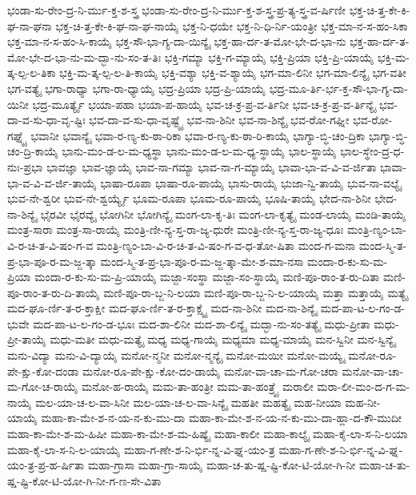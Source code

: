 {ಭಂಡಾ-ಸು-ರೇಂ-ದ್ರ-ನಿ-ರ್ಮು-ಕ್ತ-ಶ-ಸ್ತ್ರ
ಭಂಡಾ-ಸು-ರೇಂ-ದ್ರ-ನಿ-ರ್ಮು-ಕ್ತ-ಶ-ಸ್ತ್ರ-ಪ್ರ-ತ್ಯ-ಸ್ತ್ರ-ವ-ರ್ಷಿಣೀ
ಭಕ್ತ-ಚಿ-ತ್ತ-ಕೇ-ಕಿ-ಘ-ನಾ-ಘನಾ
ಭಕ್ತ-ಚಿ-ತ್ತ-ಕೇ-ಕಿ-ಘ-ನಾ-ಘ-ನಾಯೈ
ಭಕ್ತ-ನಿ-ಧಯೇ
ಭಕ್ತ-ನಿ-ಧಿ-ರ್ನಿ-ಯಂತ್ರೀ
ಭಕ್ತ-ಮಾ-ನ-ಸ-ಹಂ-ಸಿಕಾ
ಭಕ್ತ-ಮಾ-ನ-ಸ-ಹಂ-ಸಿ-ಕಾಯೈ
ಭಕ್ತ-ಸೌ-ಭಾ-ಗ್ಯ-ದಾ-ಯಿನ್ಯೈ
ಭಕ್ತ-ಹಾ-ರ್ದ-ತ-ಮೋ-ಭೇ-ದ-ಭಾ-ನು
ಭಕ್ತ-ಹಾ-ರ್ದ-ತ-ಮೋ-ಭೇ-ದ-ಭಾ-ನು-ಮ-ದ್ಭಾ-ನು-ಸಂ-ತ-ತಿಃ
ಭಕ್ತಿ-ಗಮ್ಯಾ
ಭಕ್ತಿ-ಗ-ಮ್ಯಾಯೈ
ಭಕ್ತಿ-ಪ್ರಿಯಾ
ಭಕ್ತಿ-ಪ್ರಿ-ಯಾಯೈ
ಭಕ್ತಿ-ಮ-ತ್ಕ-ಲ್ಪ-ಲ-ತಿಕಾ
ಭಕ್ತಿ-ಮ-ತ್ಕ-ಲ್ಪ-ಲ-ತಿ-ಕಾಯೈ
ಭಕ್ತಿ-ವಶ್ಯಾ
ಭಕ್ತಿ-ವ-ಶ್ಯಾಯೈ
ಭಗ-ಮಾ-ಲಿನೀ
ಭಗ-ಮಾ-ಲಿನ್ಯೈ
ಭಗ-ವತೀ
ಭಗ-ವತ್ಯೈ
ಭಗಾ-ರಾಧ್ಯಾ
ಭಗಾ-ರಾ-ಧ್ಯಾಯೈ
ಭದ್ರ-ಪ್ರಿಯಾ
ಭದ್ರ-ಪ್ರಿ-ಯಾಯೈ
ಭದ್ರ-ಮೂ-ರ್ತಿ-ರ್ಭ-ಕ್ತ-ಸೌ-ಭಾ-ಗ್ಯ-ದಾ-ಯಿನೀ
ಭದ್ರ-ಮೂರ್ತ್ಯೈ
ಭಯಾ-ಪಹಾ
ಭಯಾ-ಪ-ಹಾಯೈ
ಭವ-ಚ-ಕ್ರ-ಪ್ರ-ವ-ರ್ತಿನೀ
ಭವ-ಚ-ಕ್ರ-ಪ್ರ-ವ-ರ್ತಿನ್ಯೈ
ಭವ-ದಾ-ವ-ಸು-ಧಾ-ವೃ-ಷ್ಟಿಃ
ಭವ-ದಾ-ವ-ಸು-ಧಾ-ವೃಷ್ಟ್ಯೈ
ಭವ-ನಾ-ಶಿನೀ
ಭವ-ನಾ-ಶಿನ್ಯೈ
ಭವ-ರೋ-ಗಘ್ನೀ
ಭವ-ರೋ-ಗಘ್ನ್ಯೈ
ಭವಾನೀ
ಭವಾನ್ಯೈ
ಭವಾ-ರ-ಣ್ಯ-ಕು-ಠಾ-ರಿಕಾ
ಭವಾ-ರ-ಣ್ಯ-ಕು-ಠಾ-ರಿ-ಕಾಯೈ
ಭಾಗ್ಯಾ-ಬ್ಧಿ-ಚಂ-ದ್ರಿಕಾ
ಭಾಗ್ಯಾ-ಬ್ಧಿ-ಚಂ-ದ್ರಿ-ಕಾಯೈ
ಭಾನು-ಮಂ-ಡ-ಲ-ಮ-ಧ್ಯಸ್ಥಾ
ಭಾನು-ಮಂ-ಡ-ಲ-ಮ-ಧ್ಯ-ಸ್ಥಾಯೈ
ಭಾಲ-ಸ್ಥಾಯೈ
ಭಾಲ-ಸ್ಥೇಂ-ದ್ರ-ಧ-ನುಃ-ಪ್ರಭಾ
ಭಾವಜ್ಞಾ
ಭಾವ-ಜ್ಞಾಯೈ
ಭಾವ-ನಾ-ಗಮ್ಯಾ
ಭಾವ-ನಾ-ಗ-ಮ್ಯಾಯೈ
ಭಾವಾ-ಭಾ-ವ-ವಿ-ವ-ರ್ಜಿತಾ
ಭಾವಾ-ಭಾ-ವ-ವಿ-ವ-ರ್ಜಿ-ತಾಯೈ
ಭಾಷಾ-ರೂಪಾ
ಭಾಷಾ-ರೂ-ಪಾಯೈ
ಭಾಸು-ರಾಯೈ
ಭುಜಾ-ನ್ವಿ-ತಾಯೈ
ಭುವ-ನಾ-ವಲ್ಯೈ
ಭುವ-ನೇ-ಶ್ವರೀ
ಭುವ-ನೇ-ಶ್ವರ್ಯ್ಯೈ
ಭೂಮ-ರೂಪಾ
ಭೂಮ-ರೂ-ಪಾಯೈ
ಭೂಷಿ-ತಾಯೈ
ಭೇದ-ನಾ-ಶಿನೀ
ಭೇದ-ನಾ-ಶಿನ್ಯೈ
ಭೈರವೀ
ಭೈರವ್ಯೈ
ಭೋಗಿನೀ
ಭೋಗಿನ್ಯೈ
ಮಂಗ-ಲಾ-ಕೃ-ತಿಃ
ಮಂಗ-ಲಾ-ಕೃತ್ಯೈ
ಮಂಡ-ಲಾಯೈ
ಮಂಡಿ-ತಾಯೈ
ಮಂತ್ರ-ಸಾರಾ
ಮಂತ್ರ-ಸಾ-ರಾಯೈ
ಮಂತ್ರಿ-ಣೀ-ನ್ಯ-ಸ್ತ-ರಾ-ಜ್ಯ-ಧುರೇ
ಮಂತ್ರಿ-ಣೀ-ನ್ಯ-ಸ್ತ-ರಾ-ಜ್ಯ-ಧೂಃ
ಮಂತ್ರಿ-ಣ್ಯಂ-ಬಾ-ವಿ-ರ-ಚಿ-ತ-ವಿ-ಷಂ-ಗ-ವ
ಮಂತ್ರಿ-ಣ್ಯಂ-ಬಾ-ವಿ-ರ-ಚಿ-ತ-ವಿ-ಷಂ-ಗ-ವ-ಧ-ತೋ-ಷಿತಾ
ಮಂದ-ಗ-ಮನಾ
ಮಂದ-ಸ್ಮಿ-ತ-ಪ್ರ-ಭಾ-ಪೂ-ರ-ಮ-ಜ್ಜ-ತ್ಕಾ
ಮಂದ-ಸ್ಮಿ-ತ-ಪ್ರ-ಭಾ-ಪೂ-ರ-ಮ-ಜ್ಜ-ತ್ಕಾ-ಮೇ-ಶ-ಮಾ-ನಸಾ
ಮಂದಾ-ರ-ಕು-ಸು-ಮ-ಪ್ರಿಯಾ
ಮಂದಾ-ರ-ಕು-ಸು-ಮ-ಪ್ರಿ-ಯಾಯೈ
ಮಜ್ಜಾ-ಸಂಸ್ಥಾ
ಮಜ್ಜಾ-ಸಂ-ಸ್ಥಾಯೈ
ಮಣಿ-ಪೂ-ರಾಂ-ತ-ರು-ದಿತಾ
ಮಣಿ-ಪೂ-ರಾಂ-ತ-ರು-ದಿ-ತಾಯೈ
ಮಣಿ-ಪೂ-ರಾ-ಬ್ಜ-ನಿ-ಲಯಾ
ಮಣಿ-ಪೂ-ರಾ-ಬ್ಜ-ನಿ-ಲ-ಯಾಯೈ
ಮತ್ತಾ
ಮತ್ತಾಯೈ
ಮತ್ಯೈ
ಮದ-ಘೂ-ರ್ಣಿ-ತ-ರ-ಕ್ತಾಕ್ಷೀ
ಮದ-ಘೂ-ರ್ಣಿ-ತ-ರ-ಕ್ತಾಕ್ಷ್ಯೈ
ಮದ-ನಾ-ಶಿನೀ
ಮದ-ನಾ-ಶಿನ್ಯೈ
ಮದ-ಪಾ-ಟ-ಲ-ಗಂ-ಡ-ಭುವೇ
ಮದ-ಪಾ-ಟ-ಲ-ಗಂ-ಡ-ಭೂಃ
ಮದ-ಶಾ-ಲಿನೀ
ಮದ-ಶಾ-ಲಿನ್ಯೈ
ಮದ್ಭಾ-ನು-ಸಂ-ತತ್ಯೈ
ಮಧು-ಪ್ರೀತಾ
ಮಧು-ಪ್ರೀ-ತಾಯೈ
ಮಧು-ಮತೀ
ಮಧು-ಮತ್ಯೈ
ಮಧ್ಯ
ಮಧ್ಯ-ಗಾಯೈ
ಮಧ್ಯಮಾ
ಮಧ್ಯ-ಮಾಯೈ
ಮನ-ಸ್ವಿನೀ
ಮನ-ಸ್ವಿನ್ಯೈ
ಮನು-ವಿದ್ಯಾ
ಮನು-ವಿ-ದ್ಯಾಯೈ
ಮನೋ-ನ್ಮನೀ
ಮನೋ-ನ್ಮನ್ಯೈ
ಮನೋ-ಮಯೀ
ಮನೋ-ಮಯ್ಯೈ
ಮನೋ-ರೂ-ಪೇ-ಕ್ಷು-ಕೋ-ದಂಡಾ
ಮನೋ-ರೂ-ಪೇ-ಕ್ಷು-ಕೋ-ದಂ-ಡಾಯೈ
ಮನೋ-ವಾ-ಚಾ-ಮ-ಗೋ-ಚರಾ
ಮನೋ-ವಾ-ಚಾ-ಮ-ಗೋ-ಚ-ರಾಯೈ
ಮನೋ-ಹ-ರಾಯೈ
ಮಮ-ತಾ-ಹಂತ್ರೀ
ಮಮ-ತಾ-ಹಂತ್ರ್ಯೈ
ಮರಾಲೀ
ಮರಾ-ಲೀ-ಮಂ-ದ-ಗ-ಮ-ನಾಯೈ
ಮಲ-ಯಾ-ಚ-ಲ-ವಾ-ಸಿನೀ
ಮಲ-ಯಾ-ಚ-ಲ-ವಾ-ಸಿನ್ಯೈ
ಮಹತೀ
ಮಹತ್ಯೈ
ಮಹ-ನೀಯಾ
ಮಹ-ನೀ-ಯಾಯೈ
ಮಹಾ-ಕಾ-ಮೇ-ಶ-ನ-ಯ-ನ-ಕು-ಮು-ದಾ
ಮಹಾ-ಕಾ-ಮೇ-ಶ-ನ-ಯ-ನ-ಕು-ಮು-ದಾ-ಹ್ಲಾ-ದ-ಕೌ-ಮುದೀ
ಮಹಾ-ಕಾ-ಮೇ-ಶ-ಮ-ಹಿಷೀ
ಮಹಾ-ಕಾ-ಮೇ-ಶ-ಮ-ಹಿಷ್ಯೈ
ಮಹಾ-ಕಾಲೀ
ಮಹಾ-ಕಾಲ್ಯೈ
ಮಹಾ-ಕೈ-ಲಾ-ಸ-ನಿ-ಲಯಾ
ಮಹಾ-ಕೈ-ಲಾ-ಸ-ನಿ-ಲ-ಯಾಯೈ
ಮಹಾ-ಗ-ಣೇ-ಶ-ನಿ-ರ್ಭಿ-ನ್ನ-ವಿ-ಘ್ನ-ಯಂ-ತ್ರ
ಮಹಾ-ಗ-ಣೇ-ಶ-ನಿ-ರ್ಭಿ-ನ್ನ-ವಿ-ಘ್ನ-ಯಂ-ತ್ರ-ಪ್ರ-ಹ-ರ್ಷಿತಾ
ಮಹಾ-ಗ್ರಾಸಾ
ಮಹಾ-ಗ್ರಾ-ಸಾಯೈ
ಮಹಾ-ಚ-ತು-ಷ್ಷ-ಷ್ಟಿ-ಕೋ-ಟಿ-ಯೋ-ಗಿ-ನೀ
ಮಹಾ-ಚ-ತು-ಷ್ಷ-ಷ್ಟಿ-ಕೋ-ಟಿ-ಯೋ-ಗಿ-ನೀ-ಗ-ಣ-ಸೇ-ವಿತಾ
}
